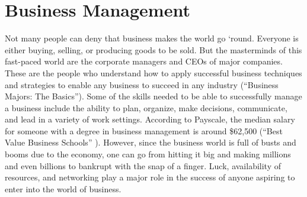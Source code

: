 \chapter{Business Management}

Not many people can deny that business makes the world go ‘round. Everyone is either buying, selling, or producing goods to be sold. But the masterminds of this fast-paced world are the corporate managers and CEOs of major companies. These are the people who understand how to apply successful business techniques and strategies to enable any business to succeed in any industry (“Business Majors: The Basics”). Some of the skills needed to be able to successfully manage a business include the ability to plan, organize, make decisions, communicate, and lead in a variety of work settings.  According to Payscale, the median salary for someone with a degree in business management is around \$62,500 (“Best Value Business Schools” ). However, since the business world is full of busts and booms due to the economy, one can go from hitting it big and making millions and even billions to bankrupt with the snap of a finger. Luck, availability of resources, and networking play a major role in the success of anyone aspiring to enter into the world of business. 

